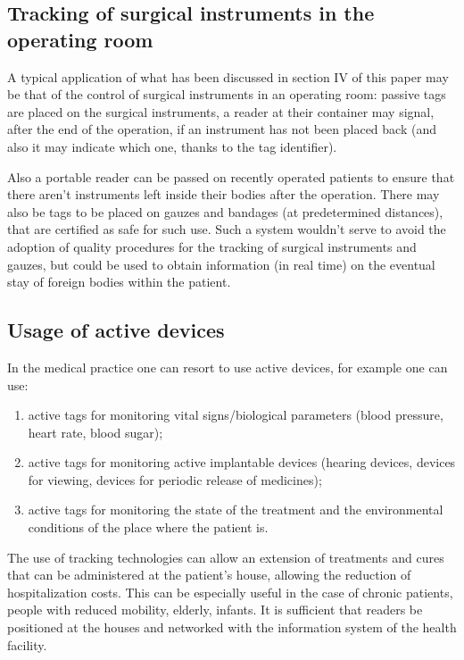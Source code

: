 \subsection[Tracking of surgical instruments in the operating room]{Tracking of surgical instruments in the operating room} 
A typical application of what has been discussed in section IV of this paper may be that of the control of surgical instruments in an operating room: passive tags are placed on the surgical instruments, a reader at their container may signal, after the end of the operation, if an instrument has not been placed back (and also it may indicate which one, thanks to the tag identifier).  

\vspace{1pc}
Also a portable reader can be passed on recently operated patients to ensure that there aren’t instruments left inside their bodies after the operation. There may also be tags to be placed on gauzes and bandages (at predetermined distances), that are certified as safe for such use.  Such a system wouldn’t serve to avoid the adoption of quality procedures for the tracking of surgical instruments and gauzes, but could be used to obtain information (in real time) on the eventual stay of foreign bodies within the patient. 

\subsection[Usage of active devices]{Usage of active devices} 
In the medical practice one can resort to use active devices, for example one can use: 

\begin{enumerate}
	\item active tags for monitoring vital signs/biological parameters (blood pressure, heart rate, blood sugar); 
	\item active tags for monitoring active implantable devices (hearing devices, devices for viewing, devices for periodic release of medicines); 
	\item active tags for monitoring the state of the treatment and the environmental conditions of the place where the patient is.  
\end{enumerate}

\vspace{1pc}
The use of tracking technologies can allow an extension of treatments and cures that can be administered at the patient's house, allowing the reduction of hospitalization costs. This can be especially useful in the case of chronic patients, people with reduced mobility, elderly, infants. It is sufficient that readers be positioned at the houses and networked with the information system of the health facility. 

